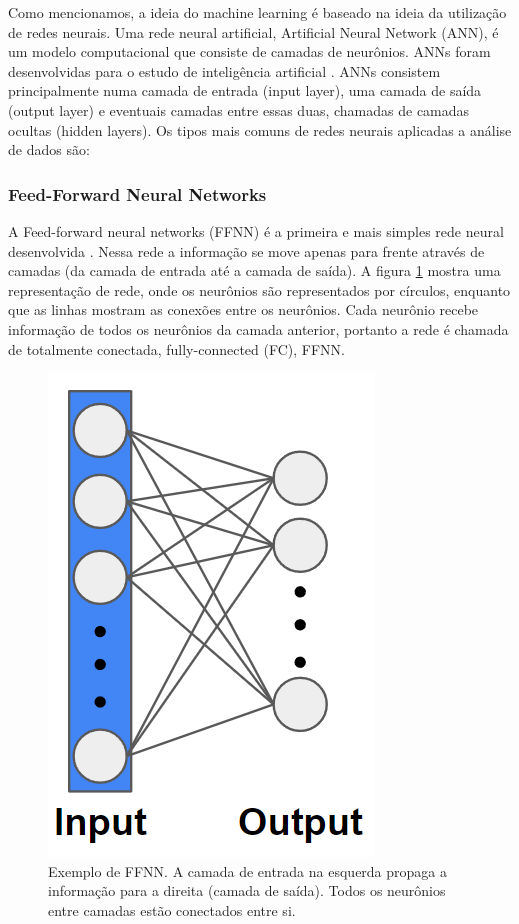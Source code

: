 \documentclass[a4paper,12pt,oneside]{book}
\begin{document}
\par Como mencionamos, a ideia do machine learning é baseado na ideia da utilização de redes neurais. Uma rede neural artificial, Artificial Neural Network (ANN), é um modelo computacional que consiste de camadas de neurônios. ANNs foram desenvolvidas para o estudo de inteligência artificial \cite{mlbook, mldiverso}. ANNs consistem principalmente numa camada de entrada (input layer), uma camada de saída (output layer) e eventuais camadas entre essas duas, chamadas de camadas ocultas (hidden layers). Os tipos mais comuns de redes neurais aplicadas a análise de dados são:

\subsubsection*{Feed-Forward Neural Networks}

\par A Feed-forward neural networks (FFNN) é a primeira e mais simples rede neural desenvolvida \cite{talent_ml, bishop2016pattern}. Nessa rede a informação se move apenas para frente através de camadas (da camada de entrada até a camada de saída). A figura \ref{fig:FFNN} mostra uma representação de rede, onde os neurônios são representados por círculos, enquanto que as linhas mostram as conexões entre os neurônios. Cada neurônio recebe informação de todos os neurônios da camada anterior, portanto a rede é chamada de totalmente conectada, fully-connected (FC), FFNN.

\begin{figure}[H]
    \centering
    \includegraphics[scale = 0.55]{figs/FFNN.png}
    \caption{Exemplo de FFNN. A camada de entrada na esquerda propaga a informação para a direita (camada de saída). Todos os neurônios entre camadas estão conectados entre si.}
    \label{fig:FFNN}
\end{figure}
\end{document}
